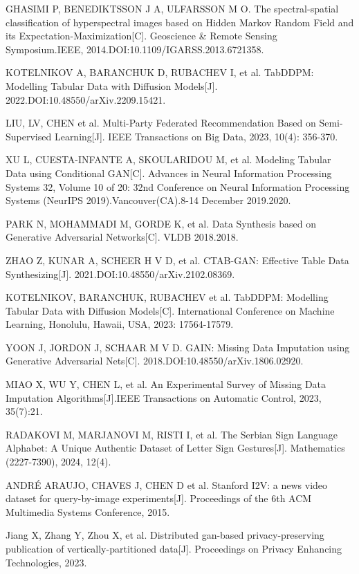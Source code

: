 \begin{thebibliography}{200}
	GHASIMI P, BENEDIKTSSON J A, ULFARSSON M O. The spectral-spatial classification of hyperspectral images based on Hidden Markov Random Field and its Expectation-Maximization[C]. Geoscience \& Remote Sensing Symposium.IEEE, 2014.DOI:10.1109/IGARSS.2013.6721358.

	KOTELNIKOV A, BARANCHUK D, RUBACHEV I, et al. TabDDPM: Modelling Tabular Data with Diffusion Models[J].  2022.DOI:10.48550/arXiv.2209.15421.

	LIU, LV, CHEN et al. Multi-Party Federated Recommendation Based on Semi-Supervised Learning[J]. IEEE Transactions on Big Data, 2023, 10(4): 356-370.

	XU L, CUESTA-INFANTE A, SKOULARIDOU M, et al. Modeling Tabular Data using Conditional GAN[C]. Advances in Neural Information Processing Systems 32, Volume 10 of 20: 32nd Conference on Neural Information Processing Systems (NeurIPS 2019).Vancouver(CA).8-14 December 2019.2020.

	PARK N, MOHAMMADI M, GORDE K, et al. Data Synthesis based on Generative Adversarial Networks[C]. VLDB 2018.2018.

	ZHAO Z, KUNAR A, SCHEER H V D, et al. CTAB-GAN: Effective Table Data Synthesizing[J].  2021.DOI:10.48550/arXiv.2102.08369.

	KOTELNIKOV, BARANCHUK, RUBACHEV et al. TabDDPM: Modelling Tabular Data with Diffusion Models[C]. International Conference on Machine Learning, Honolulu, Hawaii, USA, 2023: 17564-17579.

	YOON J, JORDON J, SCHAAR M V D. GAIN: Missing Data Imputation using Generative Adversarial Nets[C]. 2018.DOI:10.48550/arXiv.1806.02920.

	MIAO X, WU Y, CHEN L, et al. An Experimental Survey of Missing Data Imputation Algorithms[J].IEEE Transactions on Automatic Control, 2023, 35(7):21.

	RADAKOVI M, MARJANOVI M, RISTI I, et al. The Serbian Sign Language Alphabet: A Unique Authentic Dataset of Letter Sign Gestures[J]. Mathematics (2227-7390), 2024, 12(4).

	ANDRÉ ARAUJO, CHAVES J, CHEN D et al. Stanford I2V: a news video dataset for query-by-image experiments[J]. Proceedings of the 6th ACM Multimedia Systems Conference, 2015.

	Jiang X, Zhang Y, Zhou X, et al. Distributed gan-based privacy-preserving publication of vertically-partitioned data[J]. Proceedings on Privacy Enhancing Technologies, 2023.


\end{thebibliography}
